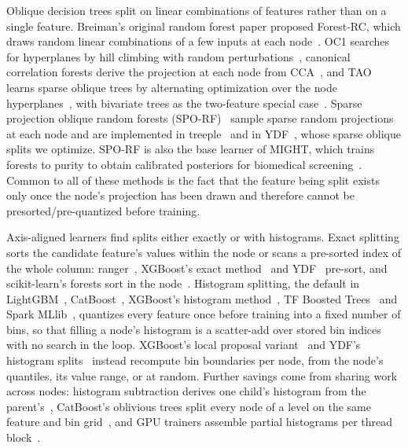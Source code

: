 \documentclass[sigconf,screen]{acmart}
\begin{document}
Oblique decision trees split on linear combinations of features rather than on a single feature. Breiman's original random forest paper proposed Forest-RC, which draws random linear combinations of a few inputs at each node~\cite{breiman}. OC1 searches for hyperplanes by hill climbing with random perturbations~\cite{murthy1994system}, canonical correlation forests derive the projection at each node from CCA~\cite{rainforth2015canonical}, and TAO learns sparse oblique trees by alternating optimization over the node hyperplanes~\cite{carreira2018alternating}, with bivariate trees as the two-feature special case~\cite{kairgeldin_bivariate_2024}. Sparse projection oblique random forests (SPO-RF)~\cite{tomita2020sparse} sample sparse random projections at each node and are implemented in treeple~\cite{treeple} and in YDF~\cite{ydf}, whose sparse oblique splits we optimize. SPO-RF is also the base learner of MIGHT, which trains forests to purity to obtain calibrated posteriors for biomedical screening~\cite{might1,might2}. Common to all of these methods is the fact that the feature being split exists only once the node's projection has been drawn and therefore cannot be presorted/pre-quantized before training.

Axis-aligned learners find splits either exactly or with histograms. Exact splitting sorts the candidate feature's values within the node or scans a pre-sorted index of the whole column: ranger~\cite{wright2017ranger}, XGBoost's exact method~\cite{chen2016xgboost} and YDF~\cite{ydf} pre-sort, and scikit-learn's forests sort in the node~\cite{pedregosa2011scikit}. Histogram splitting, the default in LightGBM~\cite{ke2017lightgbm}, CatBoost~\cite{prokhorenkova2018catboost}, XGBoost's histogram method~\cite{chen2016xgboost}, TF Boosted Trees~\cite{ponomareva2017tf} and Spark MLlib~\cite{meng2016mllib}, quantizes every feature once before training into a fixed number of bins, so that filling a node's histogram is a scatter-add over stored bin indices with no search in the loop. XGBoost's local proposal variant~\cite{chen2016xgboost} and YDF's histogram splits~\cite{ydf} instead recompute bin boundaries per node, from the node's quantiles, its value range, or at random. Further savings come from sharing work across nodes: histogram subtraction derives one child's histogram from the parent's~\cite{ke2017lightgbm}, CatBoost's oblivious trees split every node of a level on the same feature and bin grid~\cite{prokhorenkova2018catboost}, and GPU trainers assemble partial histograms per thread block~\cite{wenthundergbm19,xu2025scalagbm}. 
\end{document}
